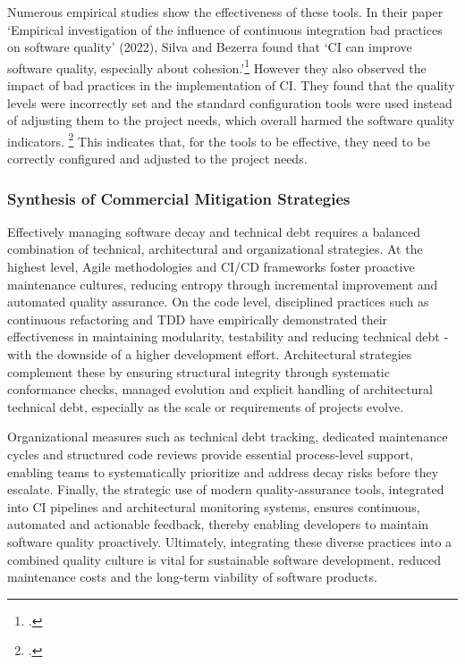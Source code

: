 Numerous empirical studies show the effectiveness of these tools. In their paper `Empirical investigation of the influence of continuous integration bad practices on software quality' (2022),
Silva and Bezerra found that `CI can improve software quality, especially about cohesion.'\footcite[4]{silvaEmpiricalInvestigationInfluence2022} However they also observed the impact
of bad practices in the implementation of CI. They found that the quality levels were incorrectly set and the standard configuration tools were used instead of 
adjusting them to the project needs, which overall harmed the software quality indicators. \footcite[4]{silvaEmpiricalInvestigationInfluence2022}
This indicates that, for the tools to be effective, they need to be correctly configured and adjusted to the project needs.\\

\subsubsection{Synthesis of Commercial Mitigation Strategies}
Effectively managing software decay and technical debt requires a balanced combination of technical, architectural and organizational strategies.
At the highest level, Agile methodologies and \ac{CI/CD} frameworks foster proactive maintenance cultures, reducing entropy through incremental improvement
and automated quality assurance. On the code level, disciplined practices such as continuous refactoring and \ac{TDD} have empirically demonstrated their effectiveness
in maintaining modularity, testability and reducing technical debt - with the downside of a higher development effort. Architectural strategies complement these
by ensuring structural integrity through systematic conformance checks, managed evolution and explicit handling of architectural technical debt, especially as
the scale or requirements of projects evolve.

Organizational measures such as technical debt tracking, dedicated maintenance cycles and structured code reviews provide essential process-level support,
enabling teams to systematically prioritize and address decay risks before they escalate. Finally, the strategic use of modern quality-assurance tools, integrated
into \ac{CI} pipelines and architectural monitoring systems, ensures continuous, automated and actionable feedback, thereby enabling developers to maintain
software quality proactively. Ultimately, integrating these diverse practices into a combined quality culture is vital for sustainable software development,
reduced maintenance costs and the long-term viability of software products.\\


